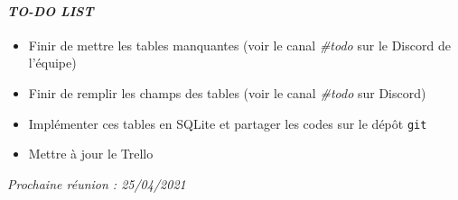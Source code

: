 \paragraph{\emph{TO-DO LIST}}
\begin{itemize}
    \item Finir de mettre les tables manquantes (voir le canal \textsl{\#todo} sur le Discord de l'équipe)
    \item Finir de remplir les champs des tables (voir le canal \textsl{\#todo} sur Discord)
    \item Implémenter ces tables en SQLite et partager les codes sur le dépôt \texttt{git}
    \item Mettre à jour le Trello
    
\end{itemize}

\emph{Prochaine réunion : 25/04/2021}\\

% 